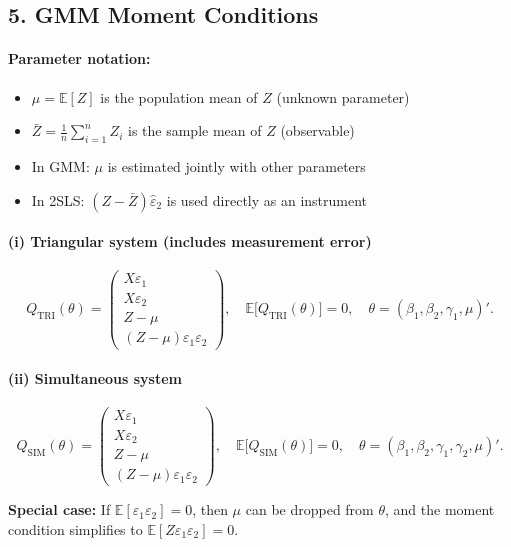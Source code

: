 \documentclass{article}
\newcommand{\E}{\mathbb{E}}
\theoremstyle{plain}
\begin{document}
\subsection*{5. GMM Moment Conditions}

\paragraph{Parameter notation:}
\begin{itemize}
\item $\mu = \E[Z]$ is the population mean of $Z$ (unknown parameter)
\item $\bar{Z} = \frac{1}{n}\sum_{i=1}^n Z_i$ is the sample mean of $Z$ (observable)
\item In GMM: $\mu$ is estimated jointly with other parameters
\item In 2SLS: $(Z - \bar{Z})\hat{\varepsilon}_2$ is used directly as an instrument
\end{itemize}

\paragraph{(i) Triangular system (includes measurement error)}
\[
Q_{\text{TRI}}(\theta)=
  \begin{pmatrix}
    X\varepsilon_1\\ 
    X\varepsilon_2\\
    Z - \mu\\
    (Z-\mu)\varepsilon_1\varepsilon_2
  \end{pmatrix},
\quad
\E\bigl[Q_{\text{TRI}}(\theta)\bigr]=0,
\quad
\theta=(\beta_1,\beta_2,\gamma_1,\mu)'.
\]

\paragraph{(ii) Simultaneous system}
\[
Q_{\text{SIM}}(\theta)=
  \begin{pmatrix}
    X\varepsilon_1\\ 
    X\varepsilon_2\\
    Z - \mu\\
    (Z-\mu)\varepsilon_1\varepsilon_2
  \end{pmatrix},
\quad
\E\bigl[Q_{\text{SIM}}(\theta)\bigr]=0,
\quad
\theta=(\beta_1,\beta_2,\gamma_1,\gamma_2,\mu)'.
\]

\textbf{Special case:} If $\E[\varepsilon_1\varepsilon_2] = 0$, then $\mu$ can be dropped from $\theta$,
and the moment condition simplifies to $\E[Z\varepsilon_1\varepsilon_2] = 0$.
\end{document}
